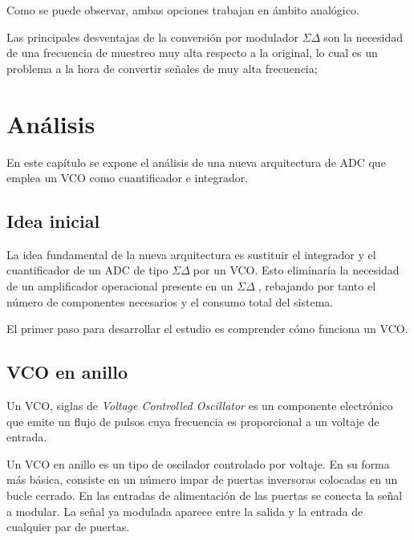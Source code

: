 \documentclass[12pt]{report} %
\newcommand{\sigmadelta}{$\Sigma\Delta\; $}
\begin{document}
	
	Como se puede observar, ambas opciones trabajan en ámbito analógico.
	
	Las principales desventajas de la conversión por modulador \sigmadelta son la necesidad de una frecuencia de muestreo muy alta respecto a la original, lo cual es un problema a la hora de convertir señales de muy alta frecuencia;
	

	
\chapter{Análisis}
	
	
	En este capítulo se expone el análisis de una nueva arquitectura de ADC que emplea un VCO como cuantificador e integrador.
	
	\section{Idea inicial}
	
	La idea fundamental de la nueva arquitectura es sustituir el integrador y el cuantificador de un ADC de tipo \sigmadelta por un VCO. Esto eliminaría la necesidad de un amplificador operacional presente en un \sigmadelta, rebajando por tanto el número de componentes necesarios y el consumo total del sistema.
	
	El primer paso para desarrollar el estudio es comprender cómo funciona un VCO.
	
	\section{VCO en anillo}
	
	Un VCO, siglas de \textit{Voltage Controlled Oscillator} es un componente electrónico que emite un flujo de pulsos cuya frecuencia es proporcional a un voltaje de entrada.
	
	Un VCO en anillo es un tipo de oscilador controlado por voltaje. En su forma más básica, consiste en un número impar de puertas inversoras colocadas en un bucle cerrado. En las entradas de alimentación de las puertas se conecta la señal a modular. La señal ya modulada aparece entre la salida y la entrada de cualquier par de puertas.
	
\end{document}
